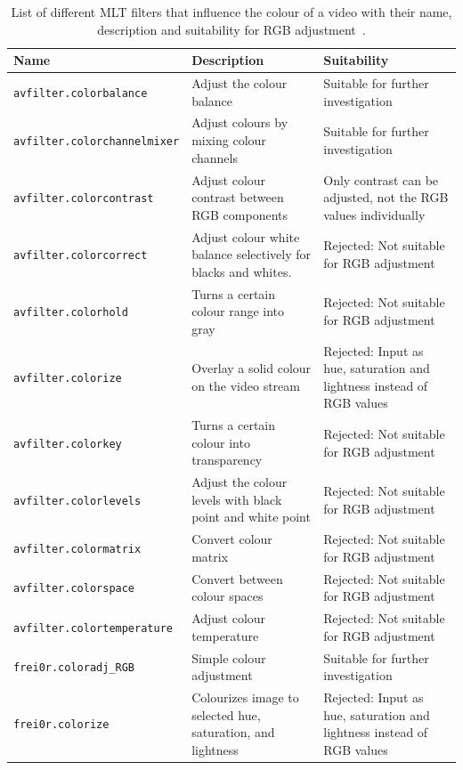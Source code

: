 \documentclass[../MasterThesis.tex]{subfiles}
\begin{document}
\begin{table}[H]
	\footnotesize
	\begin{tabular}{lp{4.4cm}p{4.5cm}}
	\toprule
	Name & Description & Suitability \\ 
	\midrule
	
	\texttt{avfilter.colorbalance} & Adjust the colour balance & Suitable for further investigation \\ 
	
	\texttt{avfilter.colorchannelmixer} & Adjust colours by mixing colour channels & Suitable for further investigation \\ 
	
	\texttt{avfilter.colorcontrast} & Adjust colour contrast between RGB components & Only contrast can be adjusted, not the RGB values individually \\ 
	
	\texttt{avfilter.colorcorrect} & Adjust colour white balance selectively for blacks and whites. & Rejected: Not suitable for RGB adjustment \\ 
	
	\texttt{avfilter.colorhold} & Turns a certain colour range into gray & Rejected: Not suitable for RGB adjustment \\ 
	
	\texttt{avfilter.colorize} & Overlay a solid colour on the video stream & Rejected: Input as hue, saturation and lightness instead of RGB values \\ 
	
	\texttt{avfilter.colorkey} & Turns a certain colour into transparency & Rejected: Not suitable for RGB adjustment \\ 
	
	\texttt{avfilter.colorlevels} & Adjust the colour levels with black point and white point & Rejected: Not suitable for RGB adjustment \\ 
	
	\texttt{avfilter.colormatrix} & Convert colour matrix & Rejected: Not suitable for RGB adjustment \\ 
	
	\texttt{avfilter.colorspace} & Convert between colour spaces & Rejected: Not suitable for RGB adjustment \\ 
	
	\texttt{avfilter.colortemperature} & Adjust colour temperature & Rejected: Not suitable for RGB adjustment \\
	
	\texttt{frei0r.coloradj\_RGB} & Simple colour adjustment & Suitable for further investigation \\ 
	
	\texttt{frei0r.colorize} & Colourizes image to selected hue, saturation, and lightness & Rejected: Input as hue, saturation and lightness instead of RGB values \\ 
	\bottomrule
	\end{tabular}
	\caption[List of MLT filters that influence the colour of a video.]{List of different MLT filters that influence the colour of a video with their name, description and suitability for RGB adjustment~\cite{melt_filters}.}
	\label{table:many_filters}
\end{table}
\end{document}
